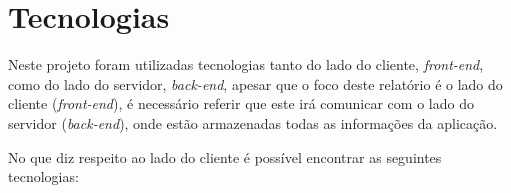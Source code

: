 \chapter{Tecnologias}

Neste projeto foram utilizadas tecnologias tanto do lado do cliente, \textit{front-end}, como do lado do servidor, \textit{back-end}, apesar que o foco deste relatório é o lado do cliente (\textit{front-end}), é necessário referir que este irá comunicar com o lado do servidor (\textit{back-end}), onde estão armazenadas todas as informações da aplicação.

No que diz respeito ao lado do cliente é possível encontrar as seguintes tecnologias:

